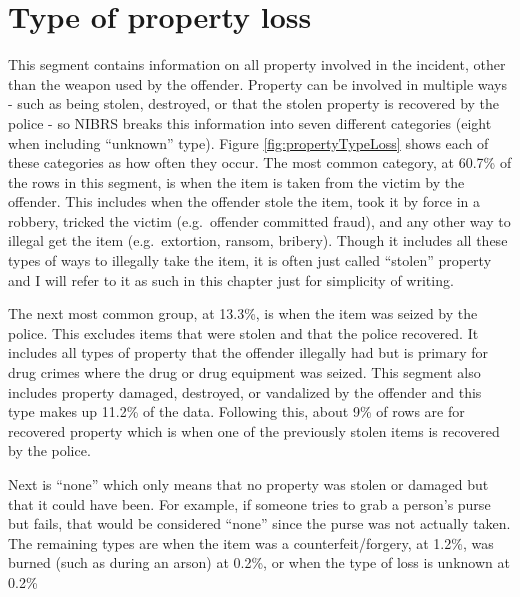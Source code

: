 \documentclass[
]{krantz}
\begin{document}
\section{Type of property loss}\label{propertyLoss}

This segment contains information on all property involved
in the incident, other than the weapon used by the offender.
Property can be involved in multiple ways - such as being
stolen, destroyed, or that the stolen property is recovered
by the police - so NIBRS breaks this information into seven
different categories (eight when including ``unknown''
type). Figure \ref{fig:propertyTypeLoss} shows each of these
categories as how often they occur. The most common
category, at 60.7\% of the rows in this segment, is when the
item is taken from the victim by the offender. This includes
when the offender stole the item, took it by force in a
robbery, tricked the victim (e.g.~offender committed fraud),
and any other way to illegal get the item (e.g.~extortion,
ransom, bribery). Though it includes all these types of ways
to illegally take the item, it is often just called
``stolen'' property and I will refer to it as such in this
chapter just for simplicity of writing.

The next most common group, at 13.3\%, is when the item was
seized by the police. This excludes items that were stolen
and that the police recovered. It includes all types of
property that the offender illegally had but is primary for
drug crimes where the drug or drug equipment was seized.
This segment also includes property damaged, destroyed, or
vandalized by the offender and this type makes up 11.2\% of
the data. Following this, about 9\% of rows are for
recovered property which is when one of the previously
stolen items is recovered by the police.

Next is ``none'' which only means that no property was
stolen or damaged but that it could have been. For example,
if someone tries to grab a person's purse but fails, that
would be considered ``none'' since the purse was not
actually taken. The remaining types are when the item was a
counterfeit/forgery, at 1.2\%, was burned (such as during an
arson) at 0.2\%, or when the type of loss is unknown at
0.2\%
\end{document}
